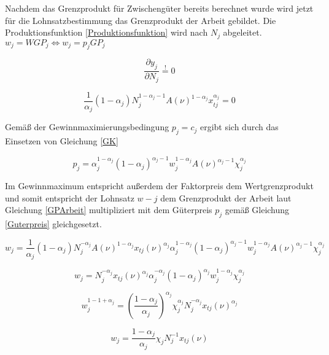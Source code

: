 Nachdem das Grenzprodukt für Zwischengüter bereits berechnet wurde wird jetzt für die Lohnsatzbestimmung das Grenzprodukt der Arbeit gebildet. Die Produktionsfunktion \eqref{Produktionsfunktion} wird nach $N_j$ abgeleitet. 
$w_j=WGP_j \Longleftrightarrow w_j=p_jGP_j$


\begin{equation}
\frac{\partial y_j}{\partial N_j}\overset{!}{=}0
\end{equation}


\begin{equation}
\frac{1}{\alpha_j}(1-\alpha_j)N_j^{1-\alpha_j-1}A(\nu)^{1-\alpha_j}x_{tj}^{\alpha_j}=0\label{GPArbeit}
\end{equation}


Gemä{\ss} der Gewinnmaximierungsbedingung $p_j=c_j$ ergibt sich durch das Einsetzen von Gleichung \eqref{GK} 


\begin{equation}
p_j=\alpha_j^{1-\alpha_j}(1-\alpha_j)^{\alpha_j-1}w_j^{1-\alpha_j}A(\nu)^{\alpha_j-1}\chi_j^{\alpha_j}\label{Guterpreis}
\end{equation}


Im Gewinnmaximum entspricht au{\ss}erdem der Faktorpreis dem Wertgrenzprodukt und somit entspricht der Lohnsatz $w-j$ dem Grenzprodukt der Arbeit laut Gleichung \eqref{GPArbeit} multipliziert mit dem Güterpreis $p_j$ gemä{\ss} Gleichung \eqref{Guterpreis} gleichgesetzt. 


\begin{equation}
w_j=\frac{1}{\alpha_j}(1-\alpha_j)N_j^{-\alpha_j}A(\nu)^{1-\alpha_j}x_{tj}(\nu)^{\alpha_j}\alpha_j^{1-\alpha_j}(1-\alpha_j)^{\alpha_j-1}w_j^{1-\alpha_j}A(\nu)^{\alpha_j-1}\chi_j^{\alpha_j}
\end{equation}


\begin{equation*}
w_j=N_j^{-\alpha_j}x_{tj}(\nu)^{\alpha_j}\alpha_j^{-\alpha_j}(1-\alpha_j)^{\alpha_j}w_j^{1-\alpha_j}\chi_j^{\alpha_j}
\end{equation*}


\begin{equation*}
w_j^{1-1+\alpha_j}=\left(\frac{1-\alpha_j}{\alpha_j}\right)^{\alpha_j}\chi_j^{\alpha_j}N_j^{-\alpha_j}x_{tj}(\nu)^{\alpha_j}
\end{equation*}


\begin{equation*}
w_j=\frac{1-\alpha_j}{\alpha_j}\chi_jN_j^{-1}x_{tj}(\nu)
\end{equation*}


